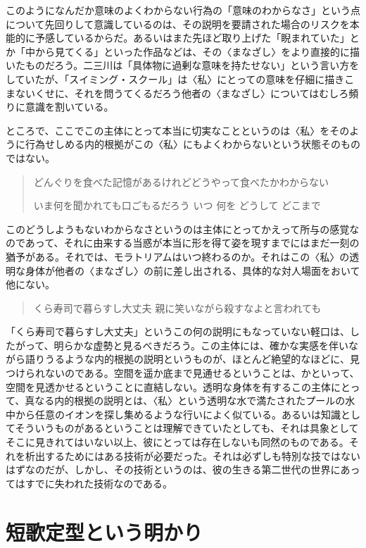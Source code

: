 \documentclass[uplatex,a4paper,oneside,landscape]{jsarticle}
\begin{document}
このようになんだか意味のよくわからない⾏為の「意味のわからなさ」という点について先回りして意識しているのは、その説明を要請された場合のリスクを本能的に予感しているからだ。あるいはまた先ほど取り上げた「睨まれていた」とか「中から⾒てくる」といった作品などは、その〈まなざし〉をより直接的に描いたものだろう。⼆三川は「具体物に過剰な意味を持たせない」という⾔い⽅をしていたが、「スイミング・スクール」は〈私〉にとっての意味を仔細に描きこまないくせに、それを問うてくるだろう他者の〈まなざし〉についてはむしろ頻りに意識を割いている。

ところで、ここでこの主体にとって本当に切実なことというのは〈私〉をそのように⾏為せしめる内的根拠がこの〈私〉にもよくわからないという状態そのものではない。

\begin{quote}
どんぐりを⾷べた記憶があるけれどどうやって⾷べたかわからない

いま何を聞かれても⼝ごもるだろう いつ 何を どうして どこまで
\end{quote}

このどうしようもないわからなさというのは主体にとってかえって所与の感覚なのであって、それに由来する当惑が本当に形を得て姿を現すまでにはまだ⼀刻の猶予がある。それでは、モラトリアムはいつ終わるのか。それはこの〈私〉の透明な⾝体が他者の〈まなざし〉の前に差し出される、具体的な対⼈場⾯をおいて他にない。

\begin{quote}
くら寿司で暮らすし⼤丈夫 親に笑いながら殺すなよと⾔われても
\end{quote}

「くら寿司で暮らすし⼤丈夫」というこの何の説明にもなっていない軽⼝は、したがって、明らかな虚勢と⾒るべきだろう。この主体には、確かな実感を伴いながら語りうるような内的根拠の説明というものが、ほとんど絶望的なほどに、⾒つけられないのである。空間を遥か底まで⾒通せるということは、かといって、空間を⾒透かせるということに直結しない。透明な⾝体を有するこの主体にとって、真なる内的根拠の説明とは、〈私〉という透明な⽔で満たされたプールの⽔中から任意のイオンを探し集めるような⾏いによく似ている。あるいは知識としてそういうものがあるということは理解できていたとしても、それは具象としてそこに⾒きれてはいない以上、彼にとっては存在しないも同然のものである。それを析出するためにはある技術が必要だった。それは必ずしも特別な技ではないはずなのだが、しかし、その技術というのは、彼の⽣きる第⼆世代の世界にあってはすでに失われた技術なのである。

\section{短歌定型という明かり}
\end{document}

